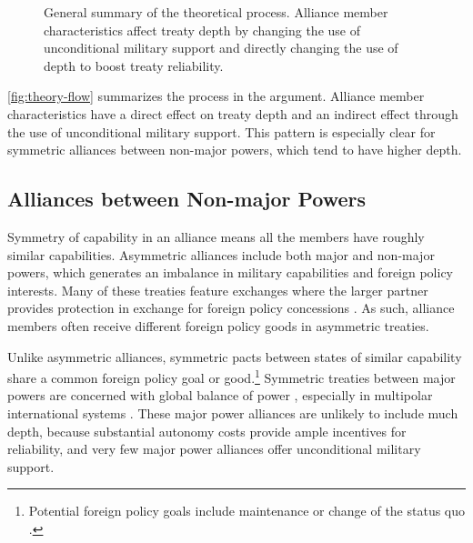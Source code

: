 \documentclass[12pt]{article}
\begin{document}
\begin{figure}
\begin{center}
 \caption{General summary of the theoretical process. Alliance member characteristics affect treaty depth by changing the use of unconditional military support and directly changing the use of depth to boost treaty reliability.}
  \label{fig:theory-flow}
\end{center} 
\end{figure}


\autoref{fig:theory-flow} summarizes the process in the argument. 
Alliance member characteristics have a direct effect on treaty depth and an indirect effect through the use of unconditional military support. 
This pattern is especially clear for symmetric alliances between non-major powers, which tend to have higher depth. 


\subsection{Alliances between Non-major Powers}

Symmetry of capability in an alliance means all the members have roughly similar capabilities. 
Asymmetric alliances include both major and non-major powers, which generates an imbalance in military capabilities and foreign policy interests. 
Many of these treaties feature exchanges where the larger partner provides protection in exchange for foreign policy concessions \citep{Morrow1991, Johnson2015}. 
As such, alliance members often receive different foreign policy goods in asymmetric treaties. 


Unlike asymmetric alliances, symmetric pacts between states of similar capability share a common foreign policy goal or good.\footnote{Potential foreign policy goals include maintenance or change of the status quo \citep{MorganPalmer2006}.} 
Symmetric treaties between major powers are concerned with global balance of power \citep{Walt1990}, especially in multipolar international systems \citep{Snyder1984, Snyder1990, ChristensenSnyder1990}. 
These major power alliances are unlikely to include much depth, because substantial autonomy costs provide ample incentives for reliability, and very few major power alliances offer unconditional military support.
\end{document}
